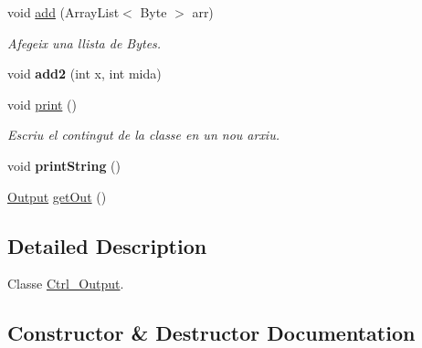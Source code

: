 \begin{DoxyCompactItemize}
void \hyperlink{classpersistencia_1_1output_1_1Ctrl__Output_a5fb2f07198a77b4fac0f95ee48e3d0b9}{add} (Array\+List$<$ Byte $>$ arr)
\begin{DoxyCompactList}\small\item\em Afegeix una llista de Bytes. \end{DoxyCompactList}\item 
\mbox{\label{classpersistencia_1_1output_1_1Ctrl__Output_ac511fa91fcb1ef8c26e5661507151af2}} 
void {\bfseries add2} (int x, int mida)
\item 
\mbox{\label{classpersistencia_1_1output_1_1Ctrl__Output_a908955c29bfecc7ebac86613bc75e9ed}} 
void \hyperlink{classpersistencia_1_1output_1_1Ctrl__Output_a908955c29bfecc7ebac86613bc75e9ed}{print} ()
\begin{DoxyCompactList}\small\item\em Escriu el contingut de la classe en un nou arxiu. \end{DoxyCompactList}\item 
\mbox{\label{classpersistencia_1_1output_1_1Ctrl__Output_a4536ad32e96d0270655a21c7c84f3bdd}} 
void {\bfseries print\+String} ()
\item 
\hyperlink{classpersistencia_1_1output_1_1Output}{Output} \hyperlink{classpersistencia_1_1output_1_1Ctrl__Output_aa36fdf4d9efc14d95f5d0d77838c6280}{get\+Out} ()
\end{DoxyCompactItemize}


\subsection{Detailed Description}
Classe \hyperlink{classpersistencia_1_1output_1_1Ctrl__Output}{Ctrl\+\_\+\+Output}. 

\subsection{Constructor \& Destructor Documentation}
\mbox{\label{classpersistencia_1_1output_1_1Ctrl__Output_afeb28ec6172b522bf6bdaf16238d622b}} 

